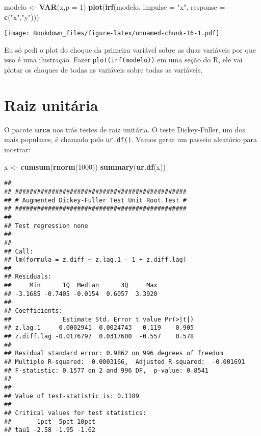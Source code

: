 \documentclass[
]{book}
\newenvironment{Shaded}{\begin{snugshade}}{\end{snugshade}}
\newcommand{\DataTypeTok}[1]{\textcolor[rgb]{0.13,0.29,0.53}{#1}}
\newcommand{\DecValTok}[1]{\textcolor[rgb]{0.00,0.00,0.81}{#1}}
\newcommand{\KeywordTok}[1]{\textcolor[rgb]{0.13,0.29,0.53}{\textbf{#1}}}
\newcommand{\NormalTok}[1]{#1}
\newcommand{\StringTok}[1]{\textcolor[rgb]{0.31,0.60,0.02}{#1}}
\begin{document}
\begin{Shaded}
\begin{Highlighting}[]
\NormalTok{modelo \textless{}{-}}\StringTok{ }\KeywordTok{VAR}\NormalTok{(x,}\DataTypeTok{p =} \DecValTok{1}\NormalTok{)}
\KeywordTok{plot}\NormalTok{(}\KeywordTok{irf}\NormalTok{(modelo, }\DataTypeTok{impulse =} \StringTok{"x"}\NormalTok{, }\DataTypeTok{response =} \KeywordTok{c}\NormalTok{(}\StringTok{"x"}\NormalTok{,}\StringTok{"y"}\NormalTok{)))}
\end{Highlighting}
\end{Shaded}

\texttt{[image: Bookdown\_files/figure-latex/unnamed-chunk-16-1.pdf]}

Eu só pedi o plot do choque da primeira variável sobre as duas variáveis por que isso é uma ilustração. Fazer \texttt{plot(irf(modelo))} em uma seção do R, ele vai plotar os choques de todas as variáveis sobre todas as variáveis.

\hypertarget{raiz-unituxe1ria}{%
\section{Raiz unitária}\label{raiz-unituxe1ria}}

O pacote \textbf{urca} nos trás testes de raiz unitária. O teste Dickey-Fuller, um dos mais populares, é chamado pelo \texttt{ur.df()}. Vamos gerar um passeio aleatório para mostrar:

\begin{Shaded}
\begin{Highlighting}[]
\NormalTok{ x \textless{}{-}}\StringTok{ }\KeywordTok{cumsum}\NormalTok{(}\KeywordTok{rnorm}\NormalTok{(}\DecValTok{1000}\NormalTok{))}
\KeywordTok{summary}\NormalTok{(}\KeywordTok{ur.df}\NormalTok{(x))}
\end{Highlighting}
\end{Shaded}

\begin{verbatim}
## 
## ############################################### 
## # Augmented Dickey-Fuller Test Unit Root Test # 
## ############################################### 
## 
## Test regression none 
## 
## 
## Call:
## lm(formula = z.diff ~ z.lag.1 - 1 + z.diff.lag)
## 
## Residuals:
##     Min      1Q  Median      3Q     Max 
## -3.1685 -0.7405 -0.0154  0.6057  3.3920 
## 
## Coefficients:
##              Estimate Std. Error t value Pr(>|t|)
## z.lag.1     0.0002941  0.0024743   0.119    0.905
## z.diff.lag -0.0176797  0.0317600  -0.557    0.578
## 
## Residual standard error: 0.9862 on 996 degrees of freedom
## Multiple R-squared:  0.0003166,  Adjusted R-squared:  -0.001691 
## F-statistic: 0.1577 on 2 and 996 DF,  p-value: 0.8541
## 
## 
## Value of test-statistic is: 0.1189 
## 
## Critical values for test statistics: 
##       1pct  5pct 10pct
## tau1 -2.58 -1.95 -1.62
\end{verbatim}
\end{document}

